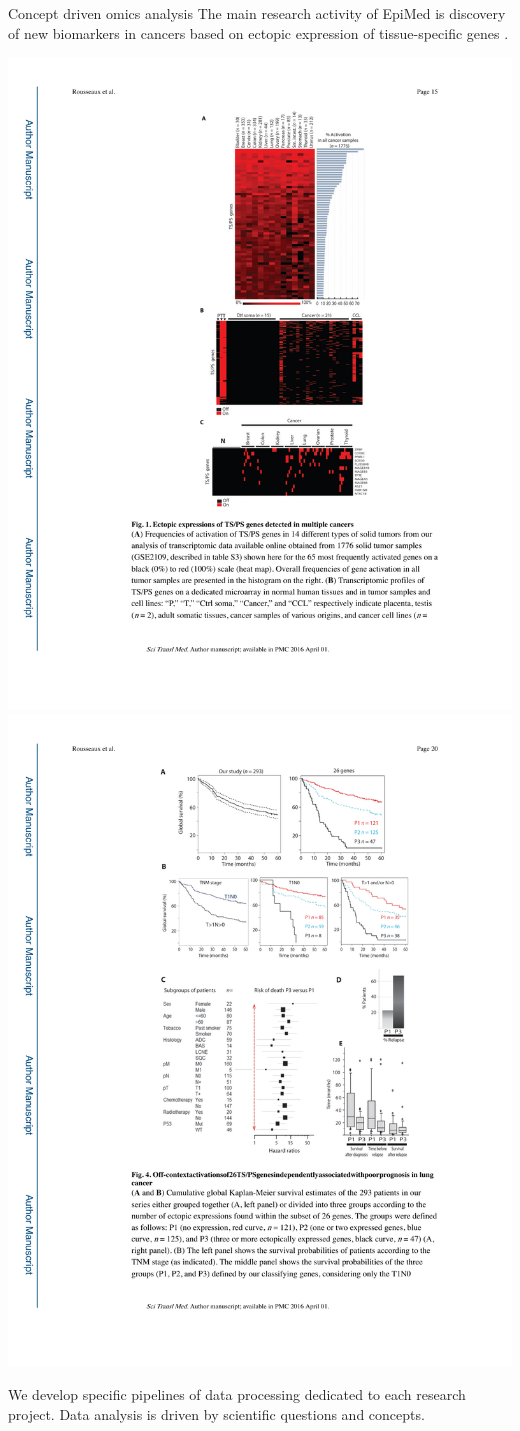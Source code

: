 \documentclass[final]{beamer}
\newlength{\twocolwid}
\begin{document}
\begin{frame}[t]
\begin{columns}[t]
\begin{column}{\twocolwid}
\begin{block}{Concept driven omics analysis}
The main research activity of EpiMed is discovery of new biomarkers in cancers based on ectopic expression of tissue-specific genes \cite{rousseaux:hal-01261754}.

{
\centering
\mbox{\includegraphics[trim = 85mm 125mm 60mm 107mm, clip, width=.58\linewidth]{figs/fig01}}
\mbox{\includegraphics[trim = 120mm 212mm 50mm 20mm, clip, width=.4\linewidth]{figs/fig02}}
}



We develop specific pipelines of data processing dedicated to each research project. Data analysis is driven by scientific questions and concepts.




\end{block}
\end{column}
\end{columns}
\end{frame}
\end{document}
